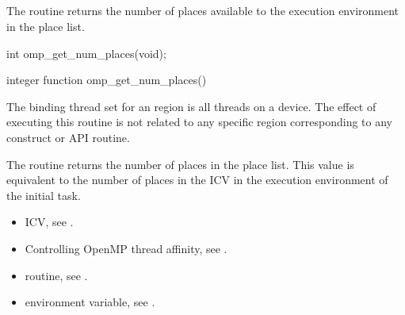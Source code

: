 \subsection{}
\label{subsec:omp_get_num_places}
\summary
The  routine returns the number of places
available to the execution environment in the place list.

\format
\begin{ccppspecific}
\begin{ompcFunction}
int omp_get_num_places(void);
\end{ompcFunction}
\end{ccppspecific}

\begin{fortranspecific}
\begin{ompfFunction}
integer function omp_get_num_places()
\end{ompfFunction}
\end{fortranspecific}

\binding
The binding thread set for an   region is all threads on a device. The effect of executing this routine is not related to any specific region corresponding to any construct or API routine.

\effect

The  routine returns the number of places in the place list. This value is equivalent to the number of places in the   ICV in the execution environment of the initial task.

\crossreferences
\begin{itemize}
\item {} ICV, see
.

\item Controlling OpenMP thread affinity, see
.

\item {} routine, see
.

\item {} environment variable, see
.
\end{itemize}





\subsection{}
\label{subsec:omp_get_place_num_procs}

